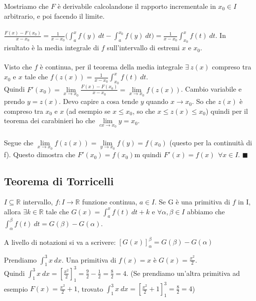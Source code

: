\begin{demostration}
Mostriamo che $F$ è derivabile calcolandone il rapporto incrementale in $x_0 \in I$ arbitrario, e poi facendo il limite.\\\\
$\frac{F(x) - F(x_0)}{x - x_0} = \frac{1}{x - x_0}\big( \int_a^x f(y) \:dt - \int_a^{x_0} f(y) \:dt \big) = \frac{1}{x - x_0} \int_{x_0}^x f(t) \:dt$. In risultato è la media integrale di $f$ sull'intervallo di estremi $x$ e $x_0$.\\\\
Visto che $f$ è continua, per il teorema della media integrale $\exists \: z(x)$ compreso tra $x_0$ e $x$ tale che $f(z(x)) = \frac{1}{x - x_0} \int_{x_0}^x f(t) \:dt$.\\
Quindi $F'(x_0) = \lim\limits_{x\to x_0}\frac{F(x) - F(x_0)}{x - x_0} = \lim\limits_{x\to x_0}f(z(x))$. Cambio variabile e prendo $y = z(x)$. Devo capire a cosa tende $y$ quando $x\to x_0$. So che $z(x)$ è compreso tra $x_0$ e $x$ (ad esempio se $x \leq x_0$, so che $x \leq z(x) \leq x_0$) quindi per il teorema dei carabinieri ho che $\lim\limits_{cx \to x_0}y = x_0$.\\\\
Segue che $\lim\limits_{x \to x_0}f(z(x)) = \lim\limits_{y \to x_0} f(y) = f(x_0)$ (questo per la continuità di f). Questo dimostra che $F'(x_0) = f(x_0)$m quindi $F'(x) = f(x) \:\: \forall x \in I$. $\blacksquare$
\end{demostration}

\newpage
\subsection{Teorema di Torricelli}
\begin{theorem}
$I \subseteq \mathbb{R}$ intervallo, $f: I \to \mathbb{R}$ funzione continua, $a \in I$. Se G è una primitiva di $f$ in I, allora $\exists k \in \mathbb{R}$ tale che $G(x) = \int_a^x f(t) \:dt + k$ e $\forall \alpha, \beta \in I$ abbiamo che $\int_{\alpha}^{\beta}f(t) \:dt = G(\beta) - G(\alpha)$.
\end{theorem}

\hspace{-15pt}A livello di notazioni si va a scrivere: $[G(x)]_{\alpha}^{\beta} = G(\beta) - G(\alpha)$

\begin{example}
Prendiamo $\int_1^3 x \:dx$. Una primitiva di $f(x) = x$ è $G(x) = \frac{x^2}{2}$. \\
Quindi $\int_1^3 x \:dx = [\frac{x^2}{2}]_1^3 = \frac{9}{2} - \frac{1}{2} = \frac{8}{2} = 4$. (Se prendiamo un'altra primitiva ad esempio $F(x) = \frac{x^2}{2} + 1$, trovato $\int_1^3 x \:dx = [\frac{x^2}{2} + 1]_1^3 = \frac{8}{2} = 4$)
\end{example}

